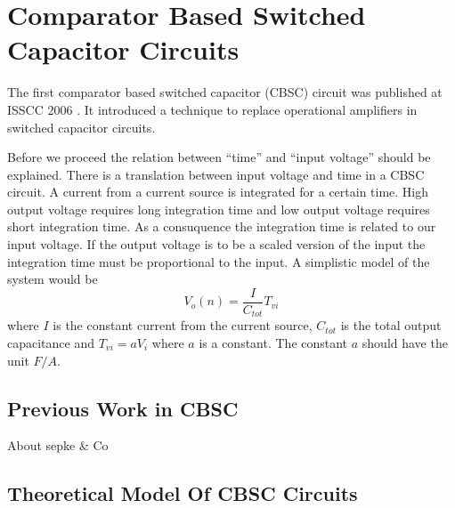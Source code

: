 \chapter{Comparator Based Switched Capacitor Circuits}



The first comparator based switched capacitor (CBSC) circuit was published
at ISSCC 2006 \cite{sepke06}. It introduced a technique to replace
operational amplifiers in switched capacitor circuits. 

Before we proceed the relation between ``time'' and ``input voltage''
should be explained. There is a translation between input voltage and
time in a CBSC circuit. A current from a current source is integrated
for a certain time. High output voltage requires long integration
time and low output voltage requires short integration
time. As a consuquence the integration time is related to our input
voltage. If the output voltage is to be a scaled version of the input
the integration time must be proportional to the input. A simplistic
model of the system would be 
\begin{equation}
  \label{eq:1}
  V_o(n) = \frac{I}{C_{tot}}T_{vi}
\end{equation}
where $I$ is the constant current from the current source, $C_{tot}$
is the total output capacitance and $T_{vi} = a V_i$ where $a$ is a
constant. The constant $a$ should
have the unit $F/A$.

\section{Previous Work in CBSC}
About sepke \& Co

\section{Theoretical Model Of CBSC Circuits}


